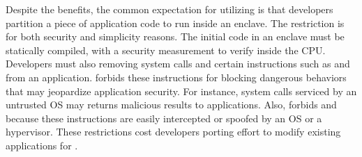 

Despite the benefits,
the common expectation for utilizing \sgx{} is
that developers partition a piece of application code to run inside an enclave.
The restriction is for both security and simplicity reasons.
The initial code in an enclave must be
statically compiled,
with a security measurement to verify inside the CPU.
Developers must also removing system calls and
certain instructions such as  and  from an application.
\sgx{} forbids these instructions
for blocking
dangerous behaviors that may jeopardize application security.
For instance,
system calls serviced by an untrusted OS
may returns malicious results
to applications.
Also, \sgx{} forbids  and  because these instructions are easily intercepted or spoofed by an OS
or a hypervisor.
These restrictions cost developers porting effort to modify existing applications for \sgx{}.



